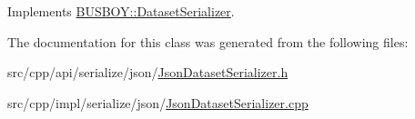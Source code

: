 Implements \hyperlink{classBUSBOY_1_1DatasetSerializer_a1c949eb74f1b6277361237633c0f1343}{BUSBOY::DatasetSerializer}.

The documentation for this class was generated from the following files:\begin{DoxyCompactItemize}
\item 
src/cpp/api/serialize/json/\hyperlink{JsonDatasetSerializer_8h}{JsonDatasetSerializer.h}\item 
src/cpp/impl/serialize/json/\hyperlink{JsonDatasetSerializer_8cpp}{JsonDatasetSerializer.cpp}\end{DoxyCompactItemize}

